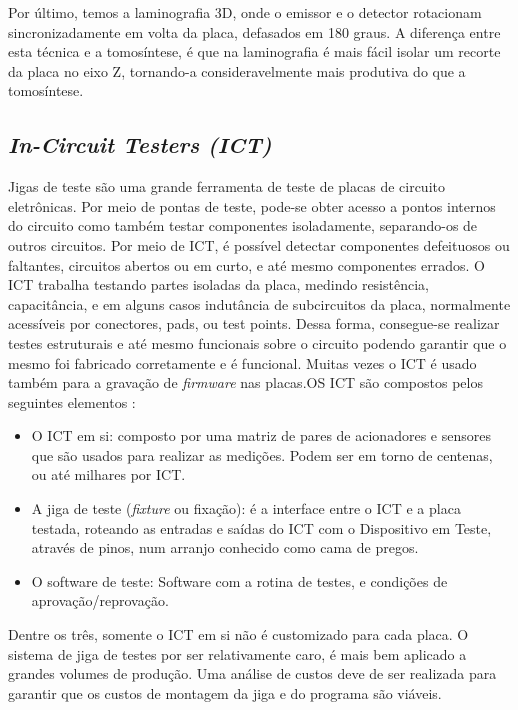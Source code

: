 Por último, temos a laminografia 3D, onde o emissor e o detector rotacionam sincronizadamente em volta da placa, defasados em 180 graus. A diferença entre esta técnica e a tomosíntese, é que na laminografia é mais fácil isolar um recorte da placa no eixo Z, tornando-a consideravelmente mais produtiva do que a tomosíntese.

\subsection{\textit{In-Circuit Testers (ICT)}}

Jigas de teste são uma grande ferramenta de teste de placas de circuito eletrônicas. Por meio de pontas de teste, pode-se obter acesso a pontos internos do circuito como também testar componentes isoladamente, separando-os de outros circuitos. Por meio de ICT, é possível detectar componentes defeituosos ou faltantes, circuitos abertos ou em curto, e até mesmo componentes errados. O ICT trabalha testando partes isoladas da placa, medindo resistência, capacitância, e em alguns casos indutância de subcircuitos da placa, normalmente acessíveis por conectores, pads, ou test points. Dessa forma, consegue-se realizar testes estruturais e até mesmo funcionais sobre o circuito podendo garantir que o mesmo foi fabricado corretamente e é funcional. Muitas vezes o ICT é usado também para a gravação de \textit{firmware} nas placas.OS ICT são compostos pelos seguintes elementos \citep{ianpoole2017}:

\begin{itemize}
    \item O ICT em si: composto por uma matriz de pares de acionadores e sensores que são usados para realizar as medições. Podem ser em torno de centenas, ou até milhares por ICT.
    \item A jiga de teste (\textit{fixture} ou fixação):  é a interface entre o ICT e a placa testada, roteando as entradas e saídas do ICT com o Dispositivo em Teste, através de pinos, num arranjo conhecido como cama de pregos.
    \item O software de teste: Software com a rotina de testes, e condições de aprovação/reprovação.
\end{itemize}

Dentre os três, somente o ICT em si não é customizado para cada placa. O sistema de jiga de testes por ser relativamente caro, é mais bem aplicado a grandes volumes de produção. Uma análise de custos deve de ser realizada para garantir que os custos de montagem da jiga e do programa são viáveis. 

